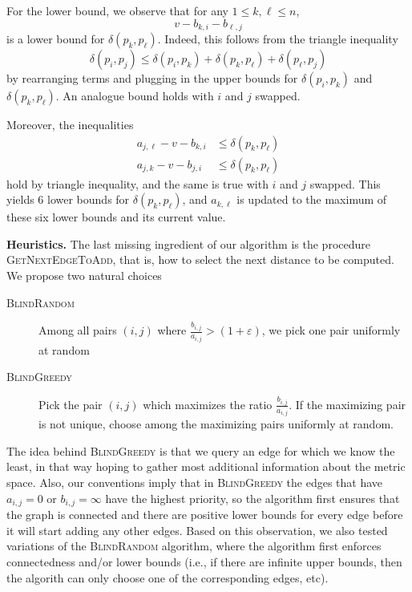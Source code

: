 \documentclass[a4paper,USenglish]{socg-lipics-v2018}
\newcommand{\eps}{\varepsilon}
\newcommand{\dist}{\delta}
\newcommand{\myparagraph}[1]{\textbf{#1.}}
\def\marrow{\marginpar[\hfill$\longrightarrow$]{$\longleftarrow$}}
\def\michael#1{\textcolor{red}{\textsc{Michael says: }{\marrow\sf #1}}}
\begin{document}
For the lower bound, we observe that for any $1\leq k,\ell\leq n$,
\[
    v-b_{k,i}-b_{\ell,j}
\]
is a lower bound for $\dist(p_k,p_\ell)$. Indeed, this follows from
the triangle inequality
%
\[\dist(p_i,p_j)\leq \dist(p_i,p_k)+\dist(p_k,p_\ell)+\dist(p_\ell,p_j)\]
by rearranging terms and plugging in the upper bounds for $\dist(p_i,p_k)$
and $\dist(p_k,p_\ell)$. An analogue bound holds with $i$ and $j$ swapped. 

Moreover, the inequalities
\begin{align*}
  a_{j,\ell} - v - b_{k,i}&\leq \dist(p_k,p_\ell)\\
  a_{j,k} - v - b_{j,i}&\leq \dist(p_k,p_\ell)
\end{align*}
hold by triangle inequality, and the same is true with $i$ and $j$ swapped.
This yields $6$ lower bounds for $\dist(p_k,p_\ell)$, and $a_{k,\ell}$
is updated to the maximum of these six lower bounds and its current value.

\myparagraph{Heuristics}
%
The last missing ingredient of our algorithm is the procedure \textsc{GetNextEdgeToAdd},
that is, how to select the next distance to be computed. We propose two natural choices

\begin{description}
\item[\textsc{BlindRandom}] Among all pairs $(i,j)$ where $\frac{b_{i,j}}{a_{i,j}}>(1+\eps)$,
we pick one pair uniformly at random
\item[\textsc{BlindGreedy}] Pick the pair $(i,j)$ which maximizes the ratio $\frac{b_{i,j}}{a_{i,j}}$.
If the maximizing pair is not unique, choose among the maximizing pairs uniformly at random.
\end{description}
%
The idea behind \textsc{BlindGreedy} is that we query an edge for which we know the least,
in that way hoping to gather most additional information about the metric space.
Also, our conventions imply that in \textsc{BlindGreedy} the edges that have $a_{i,j} = 0$ or $b_{i,j} = \infty$
have the highest priority, so the algorithm first ensures that the graph is connected and there are positive
lower bounds for every edge before it will start adding any other edges. Based on this observation,
we also tested variations of the \textsc{BlindRandom} algorithm, where the algorithm
first enforces connectedness and/or lower bounds (i.e., if there are infinite upper bounds,
then the algorith can only choose one of the corresponding edges, etc).

\end{document}
